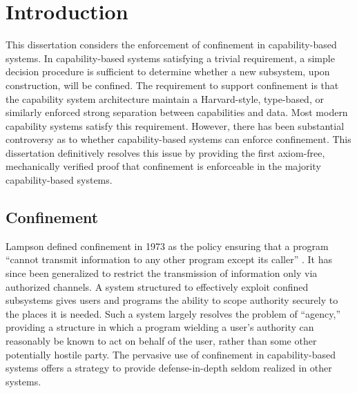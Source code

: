 \chapter{Introduction}

This dissertation considers the enforcement of confinement in capability-based systems.
In capability-based systems satisfying a trivial requirement, a simple decision procedure is sufficient to determine whether a new subsystem, upon construction, will be confined. \cite{Hardy:KeyKOS:Factory:Patent}
The requirement to support confinement is that the capability system architecture maintain a Harvard-style, type-based, or similarly enforced strong separation between capabilities and data.
Most modern capability systems satisfy this requirement.
However, there has been substantial controversy as to whether capability-based systems can enforce confinement.
This dissertation definitively resolves this issue by providing the first axiom-free, mechanically verified proof that confinement is enforceable in the majority capability-based systems.

\section{Confinement}
\label{sect:intro:confinement}

Lampson defined confinement in 1973 as the policy ensuring that a program ``cannot transmit information to any other program except its caller'' \cite{Lampson:ConfinementNote}.
It has since been generalized to restrict the transmission of information only via authorized channels.
A system structured to effectively exploit confined subsystems gives users and programs the ability to scope authority securely to the places it is needed.
Such a system largely resolves the problem of ``agency,'' providing a structure in which a program wielding a user's authority can reasonably be known to act on behalf of the user, rather than some other potentially hostile party.
The pervasive use of confinement in capability-based systems offers a strategy to provide defense-in-depth seldom realized in other systems.


